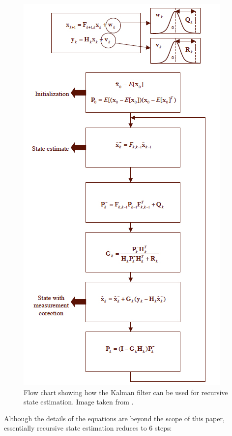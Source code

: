 \documentclass[11pt]{article}
\begin{document}
\begin{figure}[H]
\centering
\includegraphics[scale=.5]{img/stateestimation.jpg}
\caption{Flow chart showing how the Kalman filter can be used for recursive state estimation. Image taken from \cite{kalman}.}
\label{fig:stateestimation}
\end{figure}

Although the details of the equations are beyond the scope of this paper, essentially recursive state estimation reduces to 6 steps:
\end{document}
